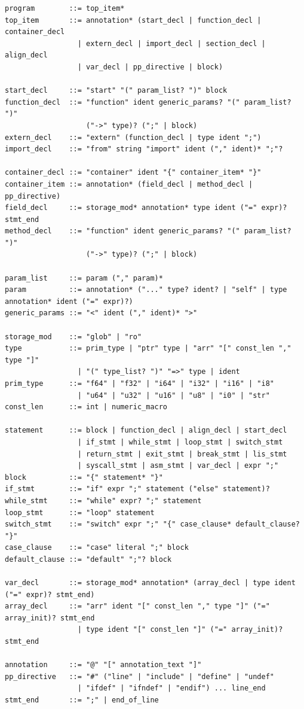 \documentclass[10pt,twocolumn]{article}
\begin{document}
\begin{lstlisting}[caption={Abridged CPL grammar.}]
program        ::= top_item*
top_item       ::= annotation* (start_decl | function_decl | container_decl
                 | extern_decl | import_decl | section_decl | align_decl
                 | var_decl | pp_directive | block)

start_decl     ::= "start" "(" param_list? ")" block
function_decl  ::= "function" ident generic_params? "(" param_list? ")"
                   ("->" type)? (";" | block)
extern_decl    ::= "extern" (function_decl | type ident ";")
import_decl    ::= "from" string "import" ident ("," ident)* ";"?

container_decl ::= "container" ident "{" container_item* "}"
container_item ::= annotation* (field_decl | method_decl | pp_directive)
field_decl     ::= storage_mod* annotation* type ident ("=" expr)? stmt_end
method_decl    ::= "function" ident generic_params? "(" param_list? ")"
                   ("->" type)? (";" | block)

param_list     ::= param ("," param)*
param          ::= annotation* ("..." type? ident? | "self" | type annotation* ident ("=" expr)?)
generic_params ::= "<" ident ("," ident)* ">"

storage_mod    ::= "glob" | "ro"
type           ::= prim_type | "ptr" type | "arr" "[" const_len "," type "]"
                 | "(" type_list? ")" "=>" type | ident
prim_type      ::= "f64" | "f32" | "i64" | "i32" | "i16" | "i8"
                 | "u64" | "u32" | "u16" | "u8" | "i0" | "str"
const_len      ::= int | numeric_macro

statement      ::= block | function_decl | align_decl | start_decl
                 | if_stmt | while_stmt | loop_stmt | switch_stmt
                 | return_stmt | exit_stmt | break_stmt | lis_stmt
                 | syscall_stmt | asm_stmt | var_decl | expr ";"
block          ::= "{" statement* "}"
if_stmt        ::= "if" expr ";" statement ("else" statement)?
while_stmt     ::= "while" expr? ";" statement
loop_stmt      ::= "loop" statement
switch_stmt    ::= "switch" expr ";" "{" case_clause* default_clause? "}"
case_clause    ::= "case" literal ";" block
default_clause ::= "default" ";"? block

var_decl       ::= storage_mod* annotation* (array_decl | type ident ("=" expr)? stmt_end)
array_decl     ::= "arr" ident "[" const_len "," type "]" ("=" array_init)? stmt_end
                 | type ident "[" const_len "]" ("=" array_init)? stmt_end

annotation     ::= "@" "[" annotation_text "]"
pp_directive   ::= "#" ("line" | "include" | "define" | "undef"
                 | "ifdef" | "ifndef" | "endif") ... line_end
stmt_end       ::= ";" | end_of_line
\end{lstlisting}
\end{document}
